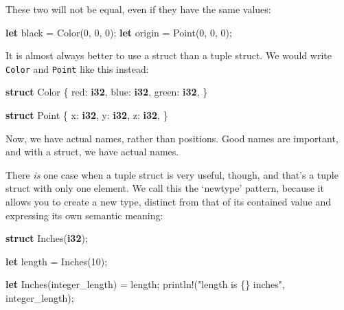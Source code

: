 \documentclass[a4paper,]{book}
\newenvironment{Shaded}{\begin{snugshade}}{\end{snugshade}}
\newcommand{\KeywordTok}[1]{\textcolor[rgb]{0.13,0.29,0.53}{\textbf{{#1}}}}
\newcommand{\DecValTok}[1]{\textcolor[rgb]{0.00,0.00,0.81}{{#1}}}
\newcommand{\StringTok}[1]{\textcolor[rgb]{0.31,0.60,0.02}{{#1}}}
\newcommand{\OtherTok}[1]{\textcolor[rgb]{0.56,0.35,0.01}{{#1}}}
\newcommand{\NormalTok}[1]{{#1}}
\begin{document}
These two will not be equal, even if they have the same values:

\begin{Shaded}
\begin{Highlighting}[]
\KeywordTok{let} \NormalTok{black = Color(}\DecValTok{0}\NormalTok{, }\DecValTok{0}\NormalTok{, }\DecValTok{0}\NormalTok{);}
\KeywordTok{let} \NormalTok{origin = Point(}\DecValTok{0}\NormalTok{, }\DecValTok{0}\NormalTok{, }\DecValTok{0}\NormalTok{);}
\end{Highlighting}
\end{Shaded}

It is almost always better to use a struct than a tuple struct. We would
write \texttt{Color} and \texttt{Point} like this instead:

\begin{Shaded}
\begin{Highlighting}[]
\KeywordTok{struct} \NormalTok{Color \{}
    \NormalTok{red: }\KeywordTok{i32}\NormalTok{,}
    \NormalTok{blue: }\KeywordTok{i32}\NormalTok{,}
    \NormalTok{green: }\KeywordTok{i32}\NormalTok{,}
\NormalTok{\}}

\KeywordTok{struct} \NormalTok{Point \{}
    \NormalTok{x: }\KeywordTok{i32}\NormalTok{,}
    \NormalTok{y: }\KeywordTok{i32}\NormalTok{,}
    \NormalTok{z: }\KeywordTok{i32}\NormalTok{,}
\NormalTok{\}}
\end{Highlighting}
\end{Shaded}

Now, we have actual names, rather than positions. Good names are
important, and with a struct, we have actual names.

There \emph{is} one case when a tuple struct is very useful, though, and
that's a tuple struct with only one element. We call this the `newtype'
pattern, because it allows you to create a new type, distinct from that
of its contained value and expressing its own semantic meaning:

\begin{Shaded}
\begin{Highlighting}[]
\KeywordTok{struct} \NormalTok{Inches(}\KeywordTok{i32}\NormalTok{);}

\KeywordTok{let} \NormalTok{length = Inches(}\DecValTok{10}\NormalTok{);}

\KeywordTok{let} \NormalTok{Inches(integer_length) = length;}
\OtherTok{println!}\NormalTok{(}\StringTok{"length is \{\} inches"}\NormalTok{, integer_length);}
\end{Highlighting}
\end{Shaded}
\end{document}
